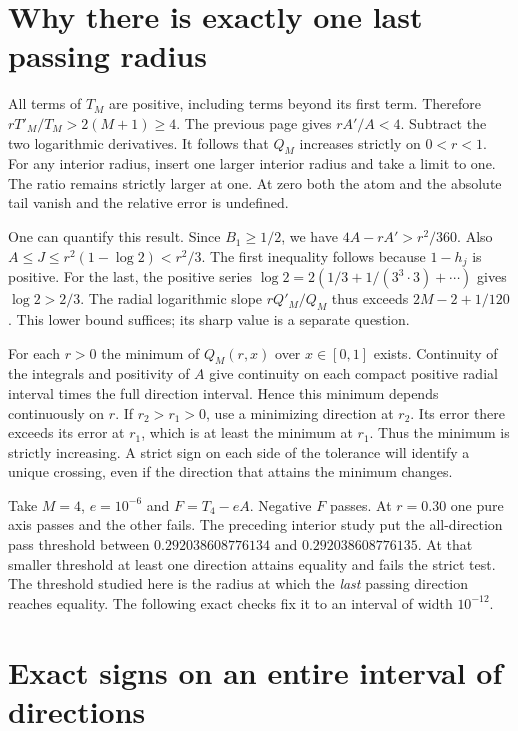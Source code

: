 \clearpage

\section{Why there is exactly one last passing radius}\label{why-there-is-exactly-one-last-passing-radius}

All terms of \(T_M\) are positive, including terms beyond its first term. Therefore \(rT'_M/T_M>2(M+1)\ge4\). The previous page gives \(rA'/A<4\). Subtract the two logarithmic derivatives. It follows that \(Q_M\) increases strictly on \(0<r<1\). For any interior radius, insert one larger interior radius and take a limit to one. The ratio remains strictly larger at one. At zero both the atom and the absolute tail vanish and the relative error is undefined.

One can quantify this result. Since \(B_1\ge1/2\), we have \(4A-rA'>r^2/360\). Also \(A\le J\le r^2(1-\log2)<r^2/3\). The first inequality follows because \(1-h_j\) is positive. For the last, the positive series \(\log2=2(1/3+1/(3^3\cdot3)+\cdots)\) gives \(\log2>2/3\). The radial logarithmic slope \(rQ'_M/Q_M\) thus exceeds \(2M-2+1/120\). This lower bound suffices; its sharp value is a separate question.

For each \(r>0\) the minimum of \(Q_M(r,x)\) over \(x\in[0,1]\) exists. Continuity of the integrals and positivity of \(A\) give continuity on each compact positive radial interval times the full direction interval. Hence this minimum depends continuously on \(r\). If \(r_2>r_1>0\), use a minimizing direction at \(r_2\). Its error there exceeds its error at \(r_1\), which is at least the minimum at \(r_1\). Thus the minimum is strictly increasing. A strict sign on each side of the tolerance will identify a unique crossing, even if the direction that attains the minimum changes.

Take \(M=4\), \(e=10^{-6}\) and \(F=T_4-eA\). Negative \(F\) passes. At \(r=0.30\) one pure axis passes and the other fails. The preceding interior study put the all-direction pass threshold between \(0.292038608776134\) and \(0.292038608776135\). At that smaller threshold at least one direction attains equality and fails the strict test. The threshold studied here is the radius at which the \emph{last} passing direction reaches equality. The following exact checks fix it to an interval of width \(10^{-12}\).

\clearpage

\section{Exact signs on an entire interval of directions}\label{exact-signs-on-an-entire-interval-of-directions}

